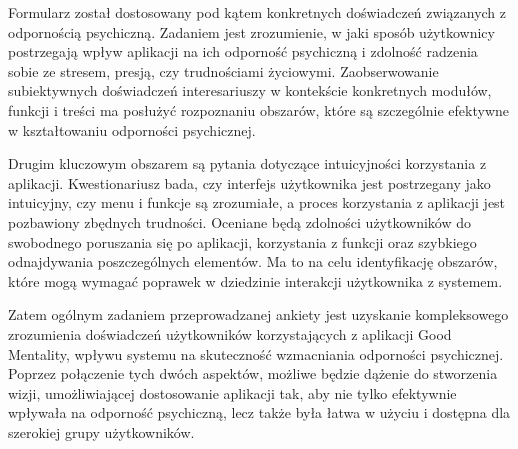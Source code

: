 Formularz został dostosowany pod kątem konkretnych doświadczeń związanych z
odpornością psychiczną. Zadaniem jest zrozumienie, w jaki sposób użytkownicy
postrzegają wpływ aplikacji na ich odporność psychiczną i zdolność radzenia
sobie ze stresem, presją, czy trudnościami życiowymi. Zaobserwowanie
subiektywnych doświadczeń interesariuszy w kontekście konkretnych modułów,
funkcji i treści ma posłużyć rozpoznaniu obszarów, które są szczególnie
efektywne w kształtowaniu odporności psychicznej.

Drugim kluczowym obszarem są pytania dotyczące intuicyjności korzystania z
aplikacji. Kwestionariusz bada, czy interfejs użytkownika jest postrzegany jako
intuicyjny, czy menu i funkcje są zrozumiałe, a proces korzystania z aplikacji
jest pozbawiony zbędnych trudności. Oceniane będą zdolności użytkowników do
swobodnego poruszania się po aplikacji, korzystania z funkcji oraz szybkiego
odnajdywania poszczególnych elementów. Ma to na celu identyfikację obszarów,
które mogą wymagać poprawek w dziedzinie interakcji użytkownika z systemem.

Zatem ogólnym zadaniem przeprowadzanej ankiety jest uzyskanie kompleksowego
zrozumienia doświadczeń użytkowników korzystających z aplikacji Good Mentality,
wpływu systemu na skuteczność wzmacniania odporności psychicznej. Poprzez
połączenie tych dwóch aspektów, możliwe będzie dążenie do stworzenia wizji,
umożliwiającej dostosowanie aplikacji tak, aby nie tylko efektywnie wpływała na
odporność psychiczną, lecz także była łatwa w użyciu i dostępna dla szerokiej
grupy użytkowników. 

